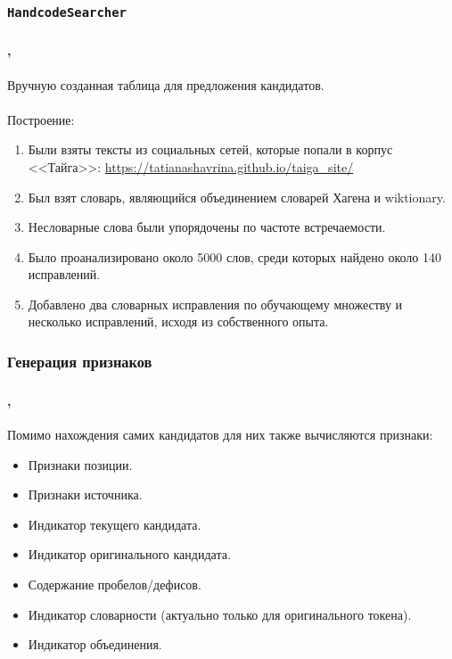 \documentclass[t]{beamer}  %
\begin{document}
\subsubsection{\texttt{HandcodeSearcher}}
\begin{frame}
	\frametitle{\insertsection} 
	\framesubtitle{\insertsubsection, \insertsubsubsection}
	
	Вручную созданная таблица для предложения кандидатов.\\~\\
	
	Построение:
		\begin{enumerate}
			\item Были взяты тексты из социальных сетей, которые попали в корпус <<Тайга>>: \url{https://tatianashavrina.github.io/taiga_site/}
			\item Был взят словарь, являющийся объединением словарей Хагена и wiktionary.
			\item Несловарные слова были упорядочены по частоте встречаемости.
			\item Было проанализировано около 5000 слов, среди которых найдено около 140 исправлений.
			\item Добавлено два словарных исправления по обучающему множеству и несколько исправлений, исходя из собственного опыта.
		\end{enumerate}
\end{frame}

\subsubsection{Генерация признаков}
\begin{frame}
	\frametitle{\insertsection} 
	\framesubtitle{\insertsubsection, \insertsubsubsection}
	
	Помимо нахождения самих кандидатов для них также вычисляются признаки:
	\begin{itemize}
		\item Признаки позиции.
		\item Признаки источника.
		\item Индикатор текущего кандидата.
		\item Индикатор оригинального кандидата.
		\item Содержание пробелов/дефисов.
		\item Индикатор словарности (актуально только для оригинального токена).
		\item Индикатор объединения.
	\end{itemize}
\end{frame}
\end{document}
